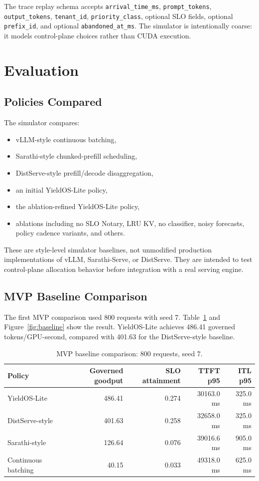 \documentclass[11pt]{article}
\begin{document}
The trace replay schema accepts \texttt{arrival\_time\_ms}, \texttt{prompt\_tokens}, \texttt{output\_tokens}, \texttt{tenant\_id}, \texttt{priority\_class}, optional SLO fields, optional \texttt{prefix\_id}, and optional \texttt{abandoned\_at\_ms}. The simulator is intentionally coarse: it models control-plane choices rather than CUDA execution.

\section{Evaluation}

\subsection{Policies Compared}

The simulator compares:

\begin{itemize}
  \item vLLM-style continuous batching,
  \item Sarathi-style chunked-prefill scheduling,
  \item DistServe-style prefill/decode disaggregation,
  \item an initial YieldOS-Lite policy,
  \item the ablation-refined YieldOS-Lite policy,
  \item ablations including no SLO Notary, LRU KV, no classifier, noisy forecasts, policy cadence variants, and others.
\end{itemize}

These are style-level simulator baselines, not unmodified production implementations of vLLM, Sarathi-Serve, or DistServe. They are intended to test control-plane allocation behavior before integration with a real serving engine.

\subsection{MVP Baseline Comparison}

The first MVP comparison used 800 requests with seed 7. Table~\ref{tab:baseline} and Figure~\ref{fig:baseline} show the result. YieldOS-Lite achieves 486.41 governed tokens/GPU-second, compared with 401.63 for the DistServe-style baseline.

\begin{table}[H]
\centering
\caption{MVP baseline comparison: 800 requests, seed 7.}
\label{tab:baseline}
\begin{tabular}{lrrrr}
\toprule
Policy & Governed goodput & SLO attainment & TTFT p95 & ITL p95 \\
\midrule
YieldOS-Lite & 486.41 & 0.274 & 30163.0 ms & 325.0 ms \\
DistServe-style & 401.63 & 0.258 & 32658.0 ms & 325.0 ms \\
Sarathi-style & 126.64 & 0.076 & 39016.6 ms & 905.0 ms \\
Continuous batching & 40.15 & 0.033 & 49318.0 ms & 625.0 ms \\
\bottomrule
\end{tabular}
\end{table}
\end{document}
